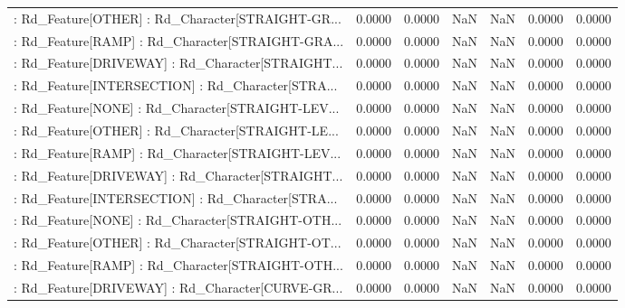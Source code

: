 \begin{longtable}{p{4cm}cccccc}
 : Rd\_Feature[OTHER] : Rd\_Character[STRAIGHT-GR... &            0.0000 &            0.0000 &     NaN &          NaN &             0.0000 &            0.0000 \\
 : Rd\_Feature[RAMP] : Rd\_Character[STRAIGHT-GRA... &            0.0000 &            0.0000 &     NaN &          NaN &             0.0000 &            0.0000 \\
 : Rd\_Feature[DRIVEWAY] : Rd\_Character[STRAIGHT... &            0.0000 &            0.0000 &     NaN &          NaN &             0.0000 &            0.0000 \\
 : Rd\_Feature[INTERSECTION] : Rd\_Character[STRA... &            0.0000 &            0.0000 &     NaN &          NaN &             0.0000 &            0.0000 \\
 : Rd\_Feature[NONE] : Rd\_Character[STRAIGHT-LEV... &            0.0000 &            0.0000 &     NaN &          NaN &             0.0000 &            0.0000 \\
 : Rd\_Feature[OTHER] : Rd\_Character[STRAIGHT-LE... &            0.0000 &            0.0000 &     NaN &          NaN &             0.0000 &            0.0000 \\
 : Rd\_Feature[RAMP] : Rd\_Character[STRAIGHT-LEV... &            0.0000 &            0.0000 &     NaN &          NaN &             0.0000 &            0.0000 \\
 : Rd\_Feature[DRIVEWAY] : Rd\_Character[STRAIGHT... &            0.0000 &            0.0000 &     NaN &          NaN &             0.0000 &            0.0000 \\
 : Rd\_Feature[INTERSECTION] : Rd\_Character[STRA... &            0.0000 &            0.0000 &     NaN &          NaN &             0.0000 &            0.0000 \\
 : Rd\_Feature[NONE] : Rd\_Character[STRAIGHT-OTH... &            0.0000 &            0.0000 &     NaN &          NaN &             0.0000 &            0.0000 \\
 : Rd\_Feature[OTHER] : Rd\_Character[STRAIGHT-OT... &            0.0000 &            0.0000 &     NaN &          NaN &             0.0000 &            0.0000 \\
 : Rd\_Feature[RAMP] : Rd\_Character[STRAIGHT-OTH... &            0.0000 &            0.0000 &     NaN &          NaN &             0.0000 &            0.0000 \\
 : Rd\_Feature[DRIVEWAY] : Rd\_Character[CURVE-GR... &            0.0000 &            0.0000 &     NaN &          NaN &             0.0000 &            0.0000 \\

\end{longtable}
